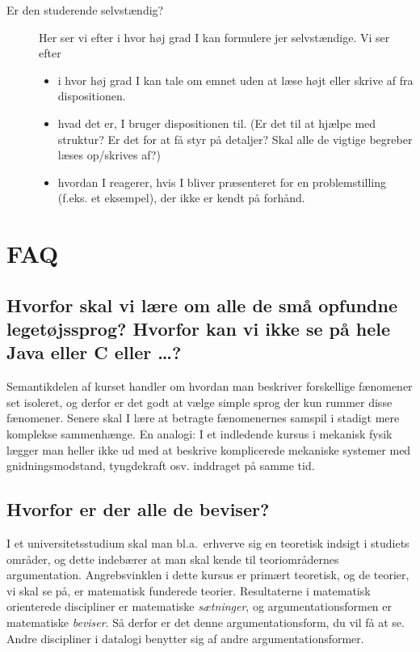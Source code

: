 \documentclass[11pt,a4paper,article,oneside]{memoir}
\begin{document}
\begin{description}
\item[\quad Er den studerende selvstændig?]
  
  Her ser vi efter i hvor høj grad I kan formulere jer selvstændige. Vi
  ser efter
  \begin{itemize}
  \item i hvor høj grad I kan tale om emnet uden at læse højt eller skrive
    af fra dispositionen.
  \item hvad det er, I bruger dispositionen til. (Er det til at hjælpe med
    struktur? Er det for at få styr på detaljer? Skal alle de vigtige
    begreber læses op/skrives af?)
  \item hvordan I reagerer, hvis I bliver præsenteret for en
    problemstilling (f.eks. et eksempel), der ikke er kendt på forhånd.
  \end{itemize}
\end{description}

\section{FAQ}

\subsection{Hvorfor skal vi lære om alle de små opfundne legetøjssprog?
  Hvorfor kan vi ikke se på hele Java eller C eller \dots?}

Semantikdelen af kurset handler om hvordan man beskriver forskellige
fænomener set isoleret, og derfor er det godt at vælge simple sprog der
kun rummer disse fænomener. Senere skal I lære at betragte fænomenernes
samspil i stadigt mere komplekse sammenhænge. En analogi: I et indledende
kursus i mekanisk fysik lægger man heller ikke ud med at beskrive
komplicerede mekaniske systemer med gnidningsmodstand, tyngdekraft osv.
inddraget på samme tid.

\subsection{Hvorfor er der alle de beviser?}

I et universitetsstudium skal man bl.a.\ erhverve sig en teoretisk indsigt
i studiets områder, og dette indebærer at man skal kende til
teoriområdernes argumentation.  Angrebsvinklen i dette kursus er primært
teoretisk, og de teorier, vi skal se på, er matematisk funderede teorier.
Resultaterne i matematisk orienterede discipliner er matematiske
\emph{sætninger}, og argumentationsformen er matematiske \emph{beviser}.
Så derfor er det denne argumentationsform, du vil få at se.  Andre
discipliner i datalogi benytter sig af andre argumentationsformer.
 
\end{document}
